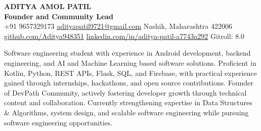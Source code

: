 \documentclass[10pt,a4paper,withhyper]{altacv}
\begin{document}
\begin{minipage}[b]{\linewidth}
  {\Huge\textbf{ADITYA AMOL PATIL}} \\[0.4em]
  {\Large\rmfamily\textcolor{MyBlue}{\textbf{Founder and Community Lead}}} \\[0.6em]
  {\small
    \textcolor{MyBlue}{\faPhone} \hspace{0.2em} +91 9657329173 \hspace{1em} 
    \textcolor{MyBlue}{\faEnvelope} \hspace{0.2em} \href{mailto:adityapatil9721@gmail.com}{adityapatil9721@gmail.com} \hspace{1em} 
    \textcolor{MyBlue}{\faMapMarker} \hspace{0.2em} Nashik, Maharashtra 422006 \\[0.4em]
    \textcolor{MyBlue}{\faGithub} \hspace{0.2em} \href{https://github.com/Aditya948351}{github.com/Aditya948351} \hspace{1em}
    \textcolor{MyBlue}{\faLinkedin} \hspace{0.2em} \href{https://linkedin.com/in/aditya-patil}{linkedin.com/in/aditya-patil-a7743a292} \hspace{1em}
    \textcolor{MyBlue}{\faCode} \hspace{0.2em} Gitroll: 8.0
  }
\end{minipage}
\vspace{1.5em}

Software engineering student with experience in Android development, backend engineering, and AI and Machine Learning based software solutions. Proficient in Kotlin, Python, REST APIs, Flask, SQL, and Firebase, with practical experience gained through internships, hackathons, and open source contributions. Founder of DevPath Community, actively fostering developer growth through technical content and collaboration. Currently strengthening expertise in Data Structures & Algorithms, system design, and scalable software engineering while pursuing software engineering opportunities.
\end{document}
